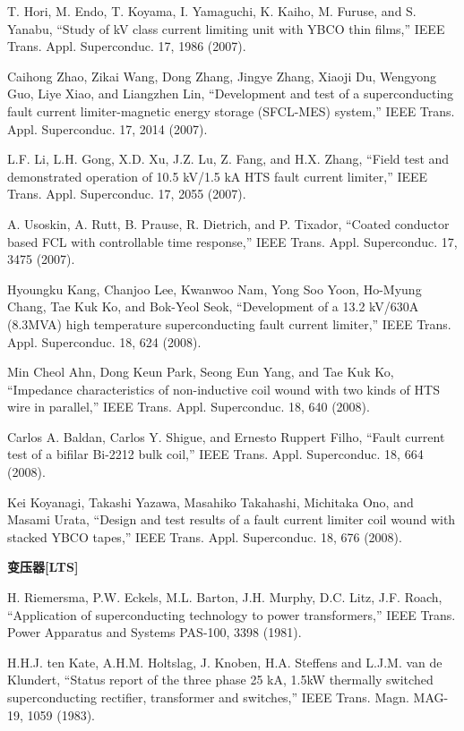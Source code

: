 \noindent [9.144] T. Hori, M. Endo, T. Koyama, I. Yamaguchi, K. Kaiho, M. Furuse, and S. Yanabu,
``Study of kV class current limiting unit with YBCO thin films,” IEEE Trans.
Appl. Superconduc. 17, 1986 (2007).

\noindent [9.145] Caihong Zhao, Zikai Wang, Dong Zhang, Jingye Zhang, Xiaoji Du, Wengyong
Guo, Liye Xiao, and Liangzhen Lin, ``Development and test of a superconducting
fault current limiter-magnetic energy storage (SFCL-MES) system,” IEEE Trans.
Appl. Superconduc. 17, 2014 (2007).

\noindent [9.146] L.F. Li, L.H. Gong, X.D. Xu, J.Z. Lu, Z. Fang, and H.X. Zhang, ``Field test
and demonstrated operation of 10.5 kV/1.5 kA HTS fault current limiter,” IEEE
Trans. Appl. Superconduc. 17, 2055 (2007).

\noindent [9.147] A. Usoskin, A. Rutt, B. Prause, R. Dietrich, and P. Tixador, ``Coated conductor
based FCL with controllable time response,” IEEE Trans. Appl. Superconduc.
17, 3475 (2007).

\noindent [9.148] Hyoungku Kang, Chanjoo Lee, Kwanwoo Nam, Yong Soo Yoon, Ho-Myung
Chang, Tae Kuk Ko, and Bok-Yeol Seok, ``Development of a 13.2 kV/630A
(8.3MVA) high temperature superconducting fault current limiter,” IEEE Trans.
Appl. Superconduc. 18, 624 (2008).

\noindent [9.149] Min Cheol Ahn, Dong Keun Park, Seong Eun Yang, and Tae Kuk Ko, ``Impedance
characteristics of non-inductive coil wound with two kinds of HTS wire in parallel,”
IEEE Trans. Appl. Superconduc. 18, 640 (2008).

\noindent [9.150] Carlos A. Baldan, Carlos Y. Shigue, and Ernesto Ruppert Filho, ``Fault current
test of a bifilar Bi-2212 bulk coil,” IEEE Trans. Appl. Superconduc. 18, 664
(2008).

\noindent [9.151] Kei Koyanagi, Takashi Yazawa, Masahiko Takahashi, Michitaka Ono, and Masami
Urata, ``Design and test results of a fault current limiter coil wound with stacked
YBCO tapes,” IEEE Trans. Appl. Superconduc. 18, 676 (2008).

\noindent \textbf{变压器[LTS] }

\noindent [9.152] H. Riemersma, P.W. Eckels, M.L. Barton, J.H. Murphy, D.C. Litz, J.F. Roach,
``Application of superconducting technology to power transformers,” IEEE Trans.
Power Apparatus and Systems PAS-100, 3398 (1981).

\noindent [9.153] H.H.J. ten Kate, A.H.M. Holtslag, J. Knoben, H.A. Steffens and L.J.M. van de
Klundert, ``Status report of the three phase 25 kA, 1.5kW thermally switched
superconducting rectifier, transformer and switches,” IEEE Trans. Magn. MAG-
19, 1059 (1983).

